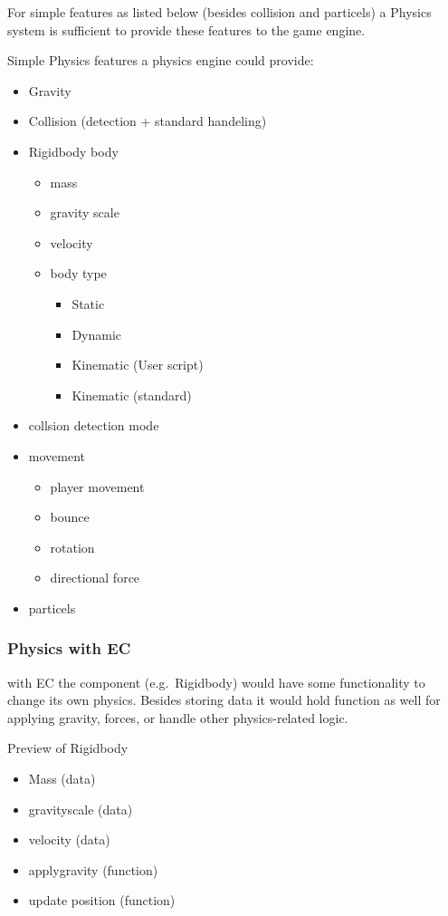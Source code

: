 \documentclass{projdoc}
\begin{document}
For simple features as listed below (besides collision and particels) a Physics
system is sufficient to provide these features to the game engine.

Simple Physics features a physics engine could provide:\noparbreak
\begin{itemize}
	\item Gravity
	\item Collision (detection + standard handeling)
	\item Rigidbody body\noparbreak
	\begin{itemize}
		\item mass
		\item gravity scale
		\item velocity
		\item body type\noparbreak
		\begin{itemize}
			\item Static
			\item Dynamic
			\item Kinematic (User script)
			\item Kinematic (standard)
		\end{itemize}
	\end{itemize}
	\item collsion detection mode
	\item movement\noparbreak
	\begin{itemize}
		\item player movement
		\item bounce
		\item rotation
		\item directional force
	\end{itemize}
	\item particels
\end{itemize}

\subsubsection{Physics with EC}

with EC the component (e.g.~Rigidbody) would have some functionality to change its
own physics. Besides storing data it would hold function as well for applying
gravity, forces, or handle other physics-related logic.

Preview of Rigidbody\noparbreak
\begin{itemize}
	\item Mass (data)
	\item gravityscale (data)
	\item velocity (data)
	\item applygravity (function)
	\item update position (function)
\end{itemize}
\end{document}
